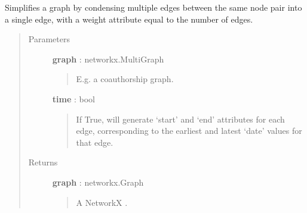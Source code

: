 \documentclass[letterpaper,10pt,english]{sphinxmanual}
\begin{document}
\begin{fulllineitems}
\label{tethne.networks.helpers:tethne.networks.helpers.simplify_multigraph}
Simplifies a graph by condensing multiple edges between the same node pair
into a single edge, with a weight attribute equal to the number of edges.
\begin{quote}\begin{description}
\item[{Parameters}] \leavevmode
\textbf{graph} : networkx.MultiGraph
\begin{quote}

E.g. a coauthorship graph.
\end{quote}

\textbf{time} : bool
\begin{quote}

If True, will generate `start' and `end' attributes for each edge,
corresponding to the earliest and latest `date' values for that edge.
\end{quote}

\item[{Returns}] \leavevmode
\textbf{graph} : networkx.Graph
\begin{quote}

A NetworkX  .
\end{quote}

\end{description}\end{quote}

\end{fulllineitems}

\end{document}
